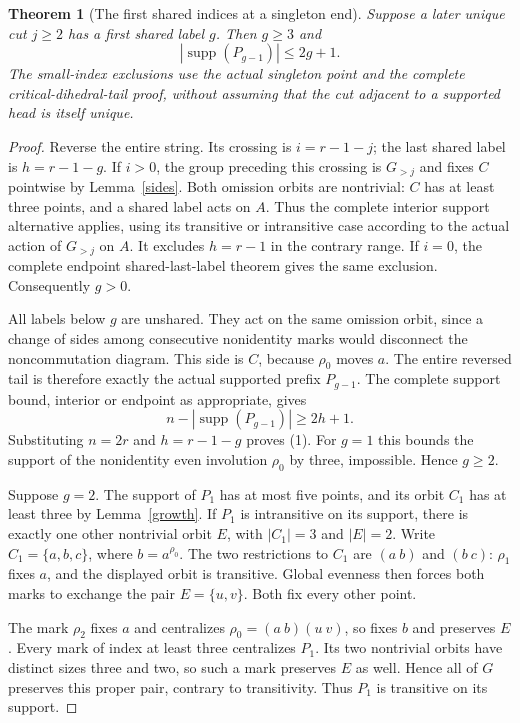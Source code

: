 \documentclass[11pt,a4paper]{article}
\newtheorem{theorem}[lemma]{Theorem}
\begin{document}
\begin{theorem}[The first shared indices at a singleton end]
Suppose a later unique cut $j\ge2$ has a first shared label $g$.
Then $g\ge3$ and
\[
             |\operatorname{supp}(P_{g-1})|\le2g+1.       \tag{1}
\]
The small-index exclusions use the actual singleton point
and the complete critical-dihedral-tail proof, without assuming
that the cut adjacent to a supported head is itself unique.
\end{theorem}
\begin{proof}
Reverse the entire string. Its crossing is $i=r-1-j$;
the last shared label is $h=r-1-g$. If $i>0$, the group
preceding this crossing is $G_{>j}$ and fixes $C$ pointwise
by Lemma~\ref{sides}. Both omission orbits are nontrivial:
$C$ has at least three points, and a shared label acts on $A$.
Thus the complete interior support alternative applies,
using its transitive or intransitive case according to the
actual action of $G_{>j}$ on $A$. It excludes $h=r-1$
in the contrary range. If $i=0$, the complete endpoint
shared-last-label theorem gives the same exclusion.
Consequently $g>0$.

\newpage
All labels below $g$ are unshared. They act on the same
omission orbit, since a change of sides among consecutive
nonidentity marks would disconnect the noncommutation diagram.
This side is $C$, because $\rho_0$ moves $a$.
The entire reversed tail is therefore exactly the actual
supported prefix $P_{g-1}$. The complete support bound,
interior or endpoint as appropriate, gives
\[
 n-|\operatorname{supp}(P_{g-1})|\ge2h+1.
\]
Substituting $n=2r$ and $h=r-1-g$ proves (1).
For $g=1$ this bounds the support of the nonidentity even
involution $\rho_0$ by three, impossible. Hence $g\ge2$.

Suppose $g=2$. The support of $P_1$ has at most five points,
and its orbit $C_1$ has at least three by Lemma~\ref{growth}.
If $P_1$ is intransitive on its support, there is exactly one
other nontrivial orbit $E$, with $|C_1|=3$ and $|E|=2$.
Write $C_1=\{a,b,c\}$, where $b=a^{\rho_0}$.
The two restrictions to $C_1$ are $(a\ b)$ and $(b\ c)$:
$\rho_1$ fixes $a$, and the displayed orbit is transitive.
Global evenness then forces both marks to exchange the pair
$E=\{u,v\}$. Both fix every other point.

The mark $\rho_2$ fixes $a$ and centralizes
$\rho_0=(a\ b)(u\ v)$, so fixes $b$ and preserves $E$.
Every mark of index at least three centralizes $P_1$.
Its two nontrivial orbits have distinct sizes three and two,
so such a mark preserves $E$ as well. Hence all of $G$
preserves this proper pair, contrary to transitivity.
Thus $P_1$ is transitive on its support.


\end{proof}
\end{document}
